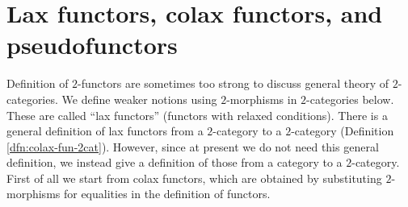 \documentclass{surv-l}
\numberwithin{equation}{chapter}
\numberwithin{figure}{chapter}
\theoremstyle{plain}
\theoremstyle{definition}
\theoremstyle{remark}
\begin{document}
\section{Lax functors, colax functors, and pseudofunctors}Definition of $2$-functors are
sometimes too strong to discuss general theory of $2$-categories.
We define weaker notions using $2$-morphisms in $2$-categories below.
These are called ``lax functors'' (functors with relaxed conditions).
There is a general definition of lax functors from a $2$-category to a $2$-category
(Definition \ref{dfn:colax-fun-2cat}).
However, since at present we do not need this general definition,
we instead give a definition of those from a category to a $2$-category.
First of all we start from colax functors, which are obtained by
substituting $2$-morphisms for equalities in the definition of functors.
\end{document}
